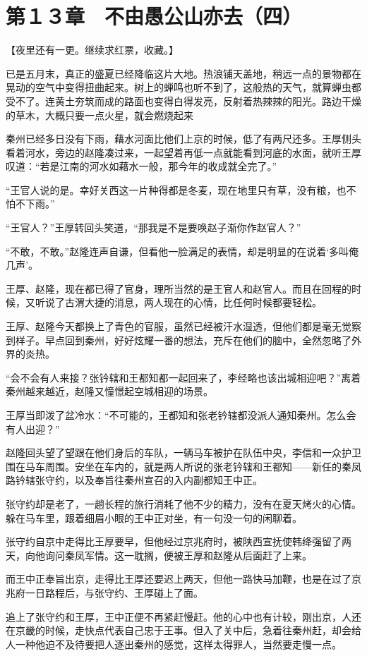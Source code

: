 \section{第１３章　不由愚公山亦去（四）}

【夜里还有一更。继续求红票，收藏。】

已是五月末，真正的盛夏已经降临这片大地。热浪铺天盖地，稍远一点的景物都在晃动的空气中变得扭曲起来。树上的蝉鸣也听不到了，这般热的天气，就算蝉虫都受不了。连黄土夯筑而成的路面也变得白得发亮，反射着热辣辣的阳光。路边干燥的草木，大概只要一点火星，就会燃烧起来

秦州已经多日没有下雨，藉水河面比他们上京的时候，低了有两尺还多。王厚侧头看着河水，旁边的赵隆凑过来，一起望着再低一点就能看到河底的水面，就听王厚叹道：“若是江南的河水如藉水一般，那今年的收成就全完了。”

“王官人说的是。幸好关西这一片种得都是冬麦，现在地里只有草，没有粮，也不怕不下雨。”

“王官人？”王厚转回头笑道，“那我是不是要唤赵子渐你作赵官人？”

“不敢，不敢。”赵隆连声自谦，但看他一脸满足的表情，却是明显的在说着‘多叫俺几声’。

王厚、赵隆，现在都已得了官身，理所当然的是王官人和赵官人。而且在回程的时候，又听说了古渭大捷的消息，两人现在的心情，比任何时候都要轻松。

王厚、赵隆今天都换上了青色的官服，虽然已经被汗水湿透，但他们都是毫无觉察到样子。早点回到秦州，好好炫耀一番的想法，充斥在他们的脑中，全然忽略了外界的炎热。

“会不会有人来接？张钤辖和王都知都一起回来了，李经略也该出城相迎吧？”离着秦州越来越近，赵隆又憧憬起空城相迎的场景。

王厚当即泼了盆冷水：“不可能的，王都知和张老钤辖都没派人通知秦州。怎么会有人出迎？”

赵隆回头望了望跟在他们身后的车队，一辆马车被护在队伍中央，李信和一众护卫围在马车周围。安坐在车内的，就是两人所说的张老钤辖和王都知——新任的秦凤路钤辖张守约，以及奉旨往秦州宣召的入内副都知王中正。

张守约却是老了，一趟长程的旅行消耗了他不少的精力，没有在夏天烤火的心情。躲在马车里，跟着细眉小眼的王中正对坐，有一句没一句的闲聊着。

张守约自京中走得比王厚要早，但他经过京兆府时，被陕西宣抚使韩绛强留了两天，向他询问秦凤军情。这一耽搁，便被王厚和赵隆从后面赶了上来。

而王中正奉旨出京，走得比王厚还要迟上两天，但他一路快马加鞭，也是在过了京兆府一日路程后，与张守约、王厚碰上了面。

追上了张守约和王厚，王中正便不再紧赶慢赶。他的心中也有计较，刚出京，人还在京畿的时候，走快点代表自己忠于王事。但入了关中后，急着往秦州赶，却会给人一种他迫不及待要把人逐出秦州的感觉，这样太得罪人，当然要走慢一点。

